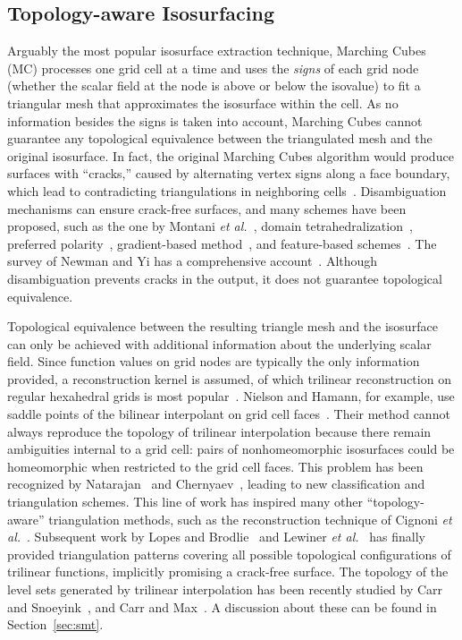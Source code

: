 \subsection{Topology-aware Isosurfacing}
Arguably the most popular isosurface extraction technique, Marching Cubes~\cite{lor87}
(MC) processes one grid cell 
at a time and uses the \emph{signs} of each grid node (whether
the scalar field at the node is above or below the isovalue) to fit a triangular mesh that
approximates the isosurface within the cell.
As no information besides the signs is taken into account, Marching
Cubes cannot guarantee any topological 
equivalence between the triangulated mesh and the original isosurface. In fact,
the original Marching
Cubes algorithm would produce surfaces with
``cracks,'' caused by alternating vertex signs along a face boundary,
which lead to contradicting triangulations in neighboring cells~\cite{Nielson:1991:ADR:949607.949621}.
Disambiguation mechanisms can ensure crack-free surfaces,
and many schemes have been proposed, such as
the one by Montani \emph{et al.}~\cite{Montani:1994:MLT},
domain tetrahedralization~\cite{Hamish06}, 
preferred polarity~\cite{Bloomenthal88}, gradient-based method~\cite{gelder:tog:1994}, and
feature-based schemes~\cite{ho:cgf:2005}.
%
The survey of Newman and Yi has a comprehensive account~\cite{newman:candg:2006}.
%
Although disambiguation prevents cracks in the output, it does not
guarantee topological equivalence.

Topological equivalence between the resulting triangle mesh and the isosurface
can only be achieved with additional information about the underlying
scalar field.
%
Since function values on grid nodes are typically the only information
provided, a reconstruction kernel is assumed, of which trilinear
reconstruction on regular hexahedral grids is most
popular~\cite{Nielson03onmarching}.
%
Nielson and
Hamann, for example,
use saddle points of the bilinear
interpolant on grid cell faces~\cite{Nielson:1991:ADR:949607.949621}. 
%
Their method cannot always reproduce the
topology of trilinear interpolation because there remain  ambiguities
internal to a grid cell: pairs of nonhomeomorphic isosurfaces could
be homeomorphic when restricted to the grid cell faces.
%
This problem has been recognized by Natarajan~\cite{Natarajan:1994:GTC:205424.205429} and 
Chernyaev~\cite{Chernyaev95marchingcubes}, leading to new classification and
triangulation schemes.
%
This line of work has inspired many other ``topology-aware'' triangulation
methods,
such as the reconstruction technique of Cignoni \emph{et al.}~\cite{Cignoni00reconstructionof}.
%
Subsequent work by Lopes and Brodlie~\cite{lopes:tvcg:2003} and
Lewiner \emph{et al.}~\cite{Lewiner:2003} has finally provided triangulation patterns covering
all possible topological configurations of trilinear functions, implicitly promising
a crack-free surface.
%
The topology of the level sets generated by trilinear interpolation
has been recently studied by Carr and Snoeyink~\cite{CS08}, and Carr
and Max~\cite{10.1109/TVCG.2009.10}. A discussion about these can be found in
Section~\ref{sec:smt}.

